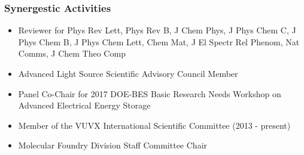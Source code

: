 \subsubsection*{Synergestic Activities}
\begin{itemize}
    \item Reviewer for Phys Rev Lett, Phys Rev B, J Chem Phys, J Phys Chem C, J Phys Chem B, J Phys Chem Lett, Chem Mat, J El Spectr Rel Phenom, Nat Comms, J Chem Theo Comp
    \item Advanced Light Source Scientific Advisory Council Member
    \item Panel Co-Chair for 2017 DOE-BES Basic Research Needs Workshop on Advanced Electrical Energy Storage
    \item Member of the VUVX International Scientific Committee (2013 - present)
    \item Molecular Foundry Division Staff Committee Chair
\end{itemize}
\clearpage